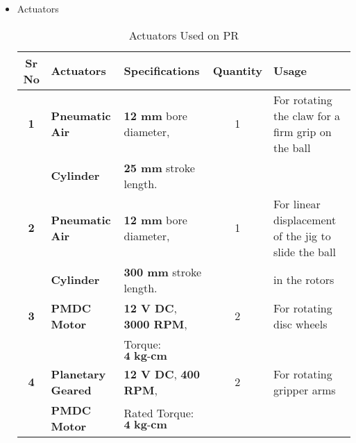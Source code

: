 \begin{itemize}
            \item Actuators
            \begin{table}[h]
                \caption {Actuators Used on PR} \label{Actuators_PR}  \small
                \begin{tabular}{|c|l|l|c|l|}
                    \hline  \hline
                    \textbf{Sr No}  & \textbf{Actuators}        & \textbf{Specifications}               & \textbf{Quantity}  & \textbf{Usage}                                               \\ \hline   \hline
                    \textbf{1}      & \textbf{Pneumatic Air}    & \textbf{12 mm} bore diameter,         & 1                  & For rotating the claw for a firm grip on the ball            \\
                                    & \textbf{Cylinder}         & \textbf{25 mm} stroke length.         &                    &                                                              \\ \hline
                    \textbf{2}      & \textbf{Pneumatic Air}    & \textbf{12 mm} bore diameter,         & 1                  & For linear displacement of the jig to slide the ball         \\
                                    & \textbf{Cylinder}         & \textbf{300 mm} stroke length.        &                    & in the rotors                                                \\ \hline                                  
                    \textbf{3}      & \textbf{PMDC Motor}       & \textbf{12 V DC},  \textbf{3000 RPM}, & 2                  & For rotating disc wheels                                     \\
                                    &                           & Torque: $\textbf{4 kg-cm}$            &                    &                                                              \\ \hline 
                    \textbf{4}      & \textbf{Planetary Geared} & \textbf{12 V DC},  \textbf{400 RPM},  & 2                  & For rotating gripper arms                                    \\
                                    & \textbf{PMDC Motor}       & Rated Torque: $\textbf{4 kg-cm}$      &                    &                                                              \\ \hline   \hline  
                \end{tabular}
            \end{table}
        \end{itemize}


